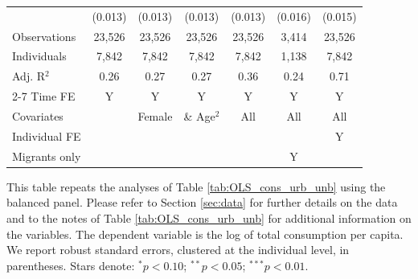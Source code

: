\begin{table}[htbp]
\begin{threeparttable}
\begin{tabular}{l cccccc}
                    &     (0.013)   &     (0.013)   &     (0.013)   &     (0.013)   &     (0.016)   &     (0.015)   \\
\addlinespace
Observations        &      23,526   &      23,526   &      23,526   &      23,526   &       3,414   &      23,526   \\
Individuals         &       7,842   &       7,842   &       7,842   &       7,842   &       1,138   &       7,842   \\
Adj. R$^{2}$        &        0.26   &        0.27   &        0.27   &        0.36   &        0.24   &        0.71   \\
\cmidrule{2-7} Time FE & Y & Y & Y & Y & Y & Y \\ Covariates & & Female & \& Age$^2$ & All & All & All \\ Individual FE & & & & & & Y \\ Migrants only & & & & & Y & \\ \bottomrule \end{tabular} \begin{tablenotes}[flushleft] \footnotesize \item{This table repeats the analyses of Table \ref{tab:OLS_cons_urb_unb}  using the balanced panel. Please refer to Section \ref{sec:data} for further details on the data and to the notes of Table \ref{tab:OLS_cons_urb_unb} for additional information on the variables. The dependent variable is the log of total consumption per capita. We report robust standard errors, clustered at the individual level, in parentheses. Stars denote: $^{*} p<0.10$; $^{**} p<0.05$; $^{***} p<0.01$.} \end{tablenotes} \end{threeparttable} \end{table}

